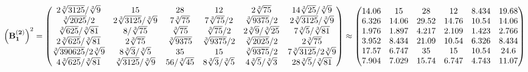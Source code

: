 \documentclass[10pt,a4paper]{article}
\begin{document}
	\[
		\left(\bold{B_1^{(2)}}\right)^{2} = 
		\begin{pmatrix}
			{{2}\sqrt[3]{3125}} / {\sqrt[3]{9}} & {{15}}{} & {{28}}{} & {{12}}{} & {{2}\sqrt[3]{75}}{} & {{14}\sqrt[3]{25}} / {\sqrt[3]{9}} \\
			{\sqrt[3]{2025}} / {{2}} & {{2}\sqrt[3]{3125}} / {\sqrt[3]{9}} & {{7}\sqrt[3]{75}}{} & {{7}\sqrt[3]{75}} / {{2}} & {\sqrt[3]{9375}} / {{2}} & {{2}\sqrt[3]{3125}} / {\sqrt[3]{9}} \\
			{\sqrt[3]{625}} / {\sqrt[3]{81}} & {{8}} / {\sqrt[3]{75}} & {\sqrt[3]{75}}{} & {\sqrt[3]{75}} / {{2}} & {{2}\sqrt[3]{9}} / {\sqrt[3]{25}} & {{7}\sqrt[3]{5}} / {\sqrt[3]{81}} \\
			{{2}\sqrt[3]{625}} / {\sqrt[3]{81}} & {{2}\sqrt[3]{75}}{} & {\sqrt[3]{9375}}{} & {\sqrt[3]{9375}} / {{2}} & {\sqrt[3]{2025}} / {{2}} & {{2}\sqrt[3]{75}}{} \\
			{\sqrt[3]{390625}} / {{2}\sqrt[3]{9}} & {{8}\sqrt[3]{3}} / {\sqrt[3]{5}} & {{35}}{} & {{15}}{} & {\sqrt[3]{9375}} / {{2}} & {{7}\sqrt[3]{3125}} / {{2}\sqrt[3]{9}} \\
			{{4}\sqrt[3]{625}} / {\sqrt[3]{81}} & {\sqrt[3]{3125}} / {\sqrt[3]{9}} & {{56}} / {\sqrt[3]{45}} & {{8}\sqrt[3]{3}} / {\sqrt[3]{5}} & {{4}\sqrt[3]{5}} / {\sqrt[3]{3}} & {{28}\sqrt[3]{5}} / {\sqrt[3]{81}} \\
		\end{pmatrix}
		\approx
		\begin{pmatrix}
			14.06    & 15       & 28       & 12       & 8.434    & 19.68    \\
			6.326    & 14.06    & 29.52    & 14.76    & 10.54    & 14.06    \\
			1.976    & 1.897    & 4.217    & 2.109    & 1.423    & 2.766    \\
			3.952    & 8.434    & 21.09    & 10.54    & 6.326    & 8.434    \\
			17.57    & 6.747    & 35       & 15       & 10.54    & 24.6     \\
			7.904    & 7.029    & 15.74    & 6.747    & 4.743    & 11.07    \\
		\end{pmatrix}
	\]
\end{document}
